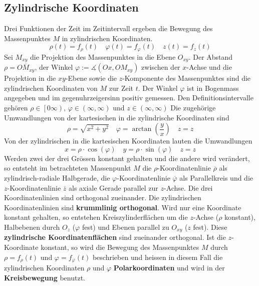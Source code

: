 \subsection{Zylindrische Koordinaten}
Drei Funktionen der Zeit im Zeitintervall ergeben die Bewegung des Massenpunktes $M$ in zylindrischen Koordinaten.
\begin{equation}
\boxed{\rho\left(t\right)=f_{\rho}\left(t\right)}\quad \boxed{\varphi\left(t\right)=f_{\varphi}\left(t\right)} \quad \boxed{z\left(t\right)=f_z(t)}
\end{equation}
Sei $M_{xy}$ die Projektion des Massenpunktes in die Ebene $O_{xy}$. Der Abstand $\rho=\overline{OM_{xy}}$, der Winkel $\varphi:=\measuredangle\left(Ox,OM_{xy}\right)$ zwischen der $x$-Achse und die Projektion in die $xy$-Ebene sowie die $z$-Komponente des Massenpunktes sind die zylindrischen Koordinaten von $M$ zur Zeit $t$. Der Winkel $\varphi$ ist in Bogenmass angegeben und im gegenuhrzeigersinn positiv gemessen. Den Definitionsintervalle gehören $\rho\in\left[0\infty\right)$, $\varphi\in\left(\infty, \infty\right)$ und $z\in\left(\infty, \infty\right)$ 
\newline\newline
Die zugehörige Umwandlungen von der kartesischen in die zylindrische Koordinaten sind
\begin{equation}
\boxed{\rho=\sqrt{x^2+y^2}}\quad \boxed{\varphi=\arctan\left(\dfrac{y}{x}\right)}\quad\boxed{z=z}
\end{equation}
Von der zylindrischen in die kartesischen Koordinaten lauten die Umwandlungen
\begin{equation}
\boxed{x=\rho\cdot\cos\left(\varphi\right)}\quad \boxed{y=\rho\cdot\sin\left(\varphi\right)}\quad \boxed{z=z}
\end{equation}
Werden zwei der drei Grössen konstant gehalten und die andere wird verändert, so entsteht im betrachteten Massenpunkt $M$ die $\rho$-Koordinatenlinie $\overline{\rho}$ als zylindrisch-radiale Halbgerade, die $\varphi$-Koordinatenlinie $\overline{\varphi}$ als Parallelkreis und die $z$-Koordinatenlinie $\overline{z}$ als axiale Gerade parallel zur $z$-Achse. Die drei Koordinatenlinien sind orthogonal zueinander. Die zylindrischen Koordinatenlinien sind \textbf{krummlinig orthogonal}.
\newline\newline
Wird nur eine Koordinate konstant gehalten, so entstehen Kreiszylinderflächen um die $z$-Achse ($\rho$ konstant), Halbebenen durch $O_z$ ($\varphi$ fest) und Ebenen parallel zu $O_{xy}$ ($z$ fest). Diese \textbf{zylindrische Koordinatenflächen} sind zueinander orthogonal.
\newline\newline
Ist die $z$-Koordinate konstant, so wird die Bewegung des Massenpunktes $M$ durch $\rho=f_{\rho}(t)$ und $\varphi=f_{\varphi}(t)$ beschrieben und heissen in diesem Fall die zylindrischen Koordinaten $\rho$ und $\varphi$ \textbf{Polarkoordinaten} und wird in der \textbf{Kreisbewegung} benutzt. 
